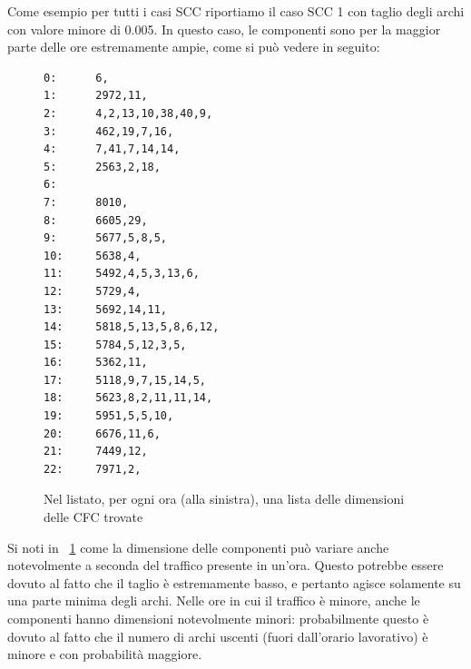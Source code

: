 \documentclass[10pt,a4paper]{article}
\begin{document}
Come esempio per tutti i casi SCC riportiamo il caso SCC 1 con taglio degli archi con valore minore di
0.005. In questo caso, le componenti sono per la maggior parte delle ore estremamente ampie, come si può vedere in seguito:
\begin{figure}
\begin{verbatim}
0:      6,
1:      2972,11,
2:      4,2,13,10,38,40,9,
3:      462,19,7,16,
4:      7,41,7,14,14,
5:      2563,2,18,
6:
7:      8010,
8:      6605,29,
9:      5677,5,8,5,
10:     5638,4,
11:     5492,4,5,3,13,6,
12:     5729,4,
13:     5692,14,11,
14:     5818,5,13,5,8,6,12,
15:     5784,5,12,3,5,
16:     5362,11,
17:     5118,9,7,15,14,5,
18:     5623,8,2,11,11,14,
19:     5951,5,5,10,
20:     6676,11,6,
21:     7449,12,
22:     7971,2,
\end{verbatim}
\caption{Nel listato, per ogni ora (alla sinistra), una lista delle dimensioni delle CFC trovate}
\label{list:scc1_0-005}
\end{figure}

Si noti in ~\ref{list:scc1_0-005} come la dimensione delle componenti può variare anche notevolmente a seconda del traffico presente in un'ora. Questo potrebbe essere dovuto al fatto che il taglio è estremamente basso, e pertanto agisce solamente su una parte minima degli archi. Nelle ore in cui il traffico è minore, anche le componenti hanno dimensioni notevolmente minori: probabilmente questo è dovuto al fatto che il numero di archi uscenti (fuori dall'orario lavorativo) è minore e con probabilità maggiore.
\end{document}
